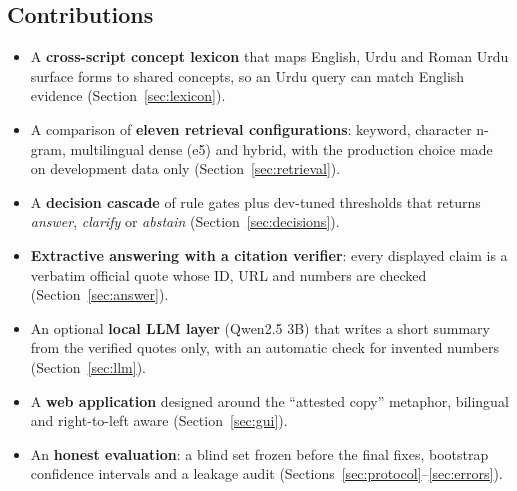 \documentclass[11pt,a4paper]{article}
\begin{document}
\subsection{Contributions}
\begin{itemize}
  \item A \textbf{cross-script concept lexicon} that maps English, Urdu and Roman Urdu surface forms to shared concepts, so an
        Urdu query can match English evidence (Section~\ref{sec:lexicon}).
  \item A comparison of \textbf{eleven retrieval configurations}: keyword, character n-gram, multilingual dense (e5) and hybrid,
        with the production choice made on development data only (Section~\ref{sec:retrieval}).
  \item A \textbf{decision cascade} of rule gates plus dev-tuned thresholds that returns \emph{answer}, \emph{clarify} or
        \emph{abstain} (Section~\ref{sec:decisions}).
  \item \textbf{Extractive answering with a citation verifier}: every displayed claim is a verbatim official quote whose ID,
        URL and numbers are checked (Section~\ref{sec:answer}).
  \item An optional \textbf{local LLM layer} (Qwen2.5 3B) that writes a short summary from the verified quotes only, with an
        automatic check for invented numbers (Section~\ref{sec:llm}).
  \item A \textbf{web application} designed around the ``attested copy'' metaphor, bilingual and right-to-left aware
        (Section~\ref{sec:gui}).
  \item An \textbf{honest evaluation}: a blind set frozen before the final fixes, bootstrap confidence intervals and a leakage
        audit (Sections~\ref{sec:protocol}--\ref{sec:errors}).
\end{itemize}
\end{document}
